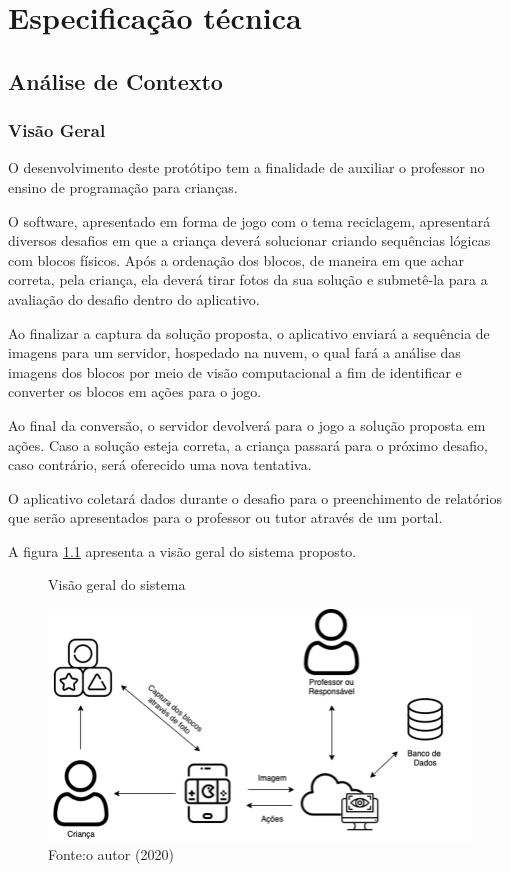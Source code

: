     \chapter{Especificação técnica} \label{cap:especificacao_tecnica}

\section{Análise de Contexto}

    \subsection{Visão Geral}
    O desenvolvimento deste protótipo tem a finalidade de auxiliar o professor no ensino de programação para crianças.
    
    O software, apresentado em forma de jogo com o tema reciclagem, apresentará diversos desafios em que a criança deverá solucionar criando sequências lógicas com blocos físicos. Após a ordenação dos blocos, de maneira em que achar correta, pela criança, ela deverá tirar fotos da sua solução e submetê-la para a avaliação do desafio dentro do aplicativo.
    
    Ao finalizar a captura da solução proposta, o aplicativo enviará a sequência de imagens para um servidor, hospedado na nuvem, o qual fará a análise das imagens dos blocos
    por meio de visão computacional a fim de identificar e converter os blocos em ações para o jogo.
    
    Ao final da conversão, o servidor devolverá para o jogo a solução proposta em ações.
    Caso a solução esteja correta, a criança passará para o próximo desafio, caso contrário, será oferecido uma nova tentativa.
    
    O aplicativo coletará dados durante o desafio para o preenchimento de relatórios que serão apresentados para o professor ou tutor através de um portal.
    
    A figura \ref{figura:diagrama_blocos} apresenta a visão geral do sistema proposto.
    
    \begin{figure}[h!]
        \centering
        \caption{Visão geral do sistema}
        \includegraphics[width=12cm]{images/cap3/diagrama_blocos.png}
        \caption*{Fonte:o autor (2020)}
        \label{figura:diagrama_blocos}
    \end{figure}
    
